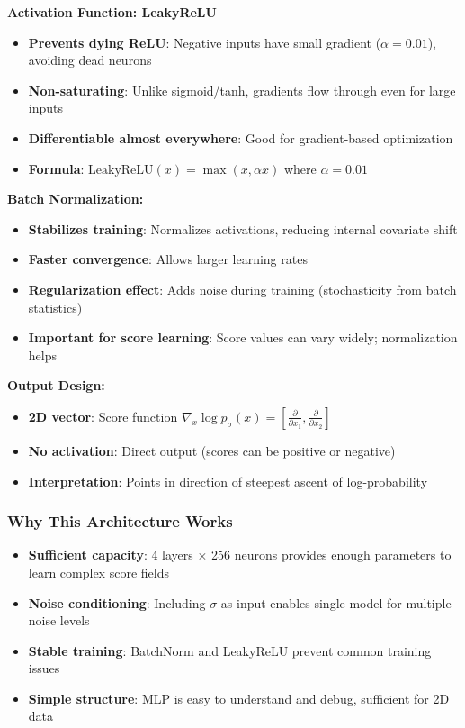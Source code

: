 \documentclass[12pt,a4paper]{article}
\begin{document}
\textbf{Activation Function: LeakyReLU}
\begin{itemize}
    \item \textbf{Prevents dying ReLU}: Negative inputs have small gradient ($\alpha = 0.01$), avoiding dead neurons
    \item \textbf{Non-saturating}: Unlike sigmoid/tanh, gradients flow through even for large inputs
    \item \textbf{Differentiable almost everywhere}: Good for gradient-based optimization
    \item \textbf{Formula}: $\text{LeakyReLU}(x) = \max(x, \alpha x)$ where $\alpha = 0.01$
\end{itemize}

\textbf{Batch Normalization:}
\begin{itemize}
    \item \textbf{Stabilizes training}: Normalizes activations, reducing internal covariate shift
    \item \textbf{Faster convergence}: Allows larger learning rates
    \item \textbf{Regularization effect}: Adds noise during training (stochasticity from batch statistics)
    \item \textbf{Important for score learning}: Score values can vary widely; normalization helps
\end{itemize}

\textbf{Output Design:}
\begin{itemize}
    \item \textbf{2D vector}: Score function $\nabla_x \log p_\sigma(x) = [\frac{\partial}{\partial x_1}, \frac{\partial}{\partial x_2}]$
    \item \textbf{No activation}: Direct output (scores can be positive or negative)
    \item \textbf{Interpretation}: Points in direction of steepest ascent of log-probability
\end{itemize}

\subsubsection{Why This Architecture Works}

\begin{itemize}
    \item \textbf{Sufficient capacity}: 4 layers × 256 neurons provides enough parameters to learn complex score fields
    \item \textbf{Noise conditioning}: Including $\sigma$ as input enables single model for multiple noise levels
    \item \textbf{Stable training}: BatchNorm and LeakyReLU prevent common training issues
    \item \textbf{Simple structure}: MLP is easy to understand and debug, sufficient for 2D data
\end{itemize}
\end{document}
